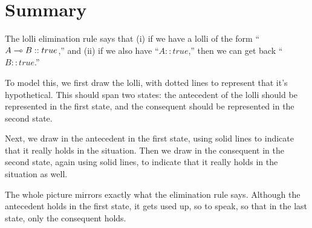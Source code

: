 \documentclass[../../../main.tex]{subfiles}
\begin{document}
\section{Summary}

The lolli elimination rule says that (i) if we have a lolli of the form ``$A \lolli/ B :: true$,'' and (ii) if we also have ``$A :: true$,'' then we can get back ``$B :: true$.'' 

To model this, we first draw the lolli, with dotted lines to represent that it's hypothetical. This should span two states: the antecedent of the lolli should be represented in the first state, and the consequent should be represented in the second state. 

Next, we draw in the antecedent in the first state, using solid lines to indicate that it really holds in the situation. Then we draw in the consequent in the second state, again using solid lines, to indicate that it really holds in the situation as well.

The whole picture mirrors exactly what the elimination rule says. Although the antecedent holds in the first state, it gets used up, so to speak, so that in the last state, only the consequent holds.
\end{document}
